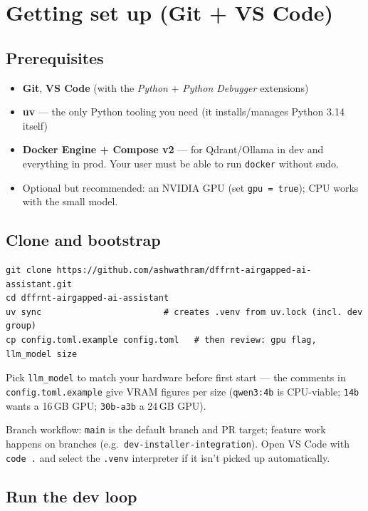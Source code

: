 \documentclass[11pt,letterpaper]{article}
\let\oldsection\section
\renewcommand{\section}{\vspace{1em}\oldsection}
\begin{document}
\section{Getting set up (Git + VS Code)}

\subsection{Prerequisites}

\begin{itemize}
  \item \textbf{Git}, \textbf{VS Code} (with the \emph{Python} +
        \emph{Python Debugger} extensions)
  \item \textbf{uv} --- the only Python tooling you need (it
        installs/manages Python 3.14 itself)
  \item \textbf{Docker Engine + Compose v2} --- for Qdrant/Ollama in dev
        and everything in prod. Your user must be able to run
        \texttt{docker} without sudo.
  \item Optional but recommended: an NVIDIA GPU (set \texttt{gpu = true});
        CPU works with the small model.
\end{itemize}

\subsection{Clone and bootstrap}

\begin{lstlisting}
git clone https://github.com/ashwathram/dffrnt-airgapped-ai-assistant.git
cd dffrnt-airgapped-ai-assistant
uv sync                        # creates .venv from uv.lock (incl. dev group)
cp config.toml.example config.toml   # then review: gpu flag, llm_model size
\end{lstlisting}

Pick \texttt{llm\_model} to match your hardware before first start --- the
comments in \texttt{config.toml.example} give VRAM figures per size
(\texttt{qwen3:4b} is CPU-viable; \texttt{14b} wants a 16\,GB GPU;
\texttt{30b-a3b} a 24\,GB GPU).

Branch workflow: \texttt{main} is the default branch and PR target; feature
work happens on branches (e.g.\ \texttt{dev-installer-integration}). Open
VS Code with \texttt{code .} and select the \texttt{.venv} interpreter if
it isn't picked up automatically.

\subsection{Run the dev loop}
\end{document}
